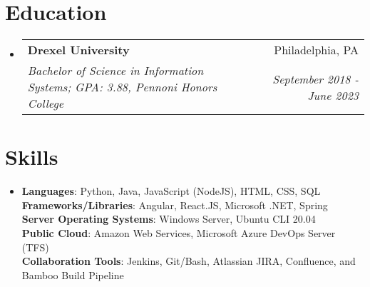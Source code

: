 \documentclass[letterpaper,11pt]{article}
\makeatletter
\newcommand{\resumeItemSmall}[2]{
        \item[]
        \small{
            \textbf{#1}{: #2 \vspace{-2pt}}
        }
    }
\newcommand{\resumeSubheading}[4]{
    \vspace{-1pt}\item[]
        \begin{tabular*}{0.97\textwidth}{l@{\extracolsep{\fill}}r}
        \textbf{#1} & #2 \\
        \textit{\small#3} & \textit{\small #4} \\
        \end{tabular*}\vspace{-5pt}
    }
\newcommand{\resumeSubItemSmall}[2]{\resumeItemSmall{#1}{#2}\vspace{-4pt}}
\newcommand{\resumeSubHeadingListStart}{\begin{itemize}[leftmargin=*]}
\newcommand{\resumeSubHeadingListEnd}{\end{itemize}}
\makeatother
\begin{document}
    \section{Education}
    \resumeSubHeadingListStart
        \resumeSubheading
        {Drexel University}{Philadelphia, PA}
        {Bachelor of Science in Information Systems; GPA: 3.88, Pennoni Honors College}{September 2018 - June 2023}
    \resumeSubHeadingListEnd

        \section{Skills}
            \resumeSubHeadingListStart
            \item[]{
                \textbf{Languages}{: Python, Java, JavaScript (NodeJS), HTML, CSS, SQL}
                \hfill \\
                \textbf{Frameworks/Libraries}{: Angular, React.JS, Microsoft .NET, Spring} \\
                \textbf{Server Operating Systems}{: Windows Server, Ubuntu CLI 20.04} \\
                \textbf{Public Cloud}{: Amazon Web Services, Microsoft Azure DevOps Server (TFS)} \\
                \textbf{Collaboration Tools}{: Jenkins, Git/Bash, Atlassian JIRA, Confluence, and Bamboo Build Pipeline} \\
            }
            \resumeSubHeadingListEnd
    
\end{document}
